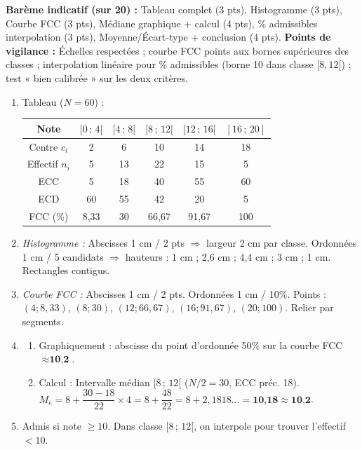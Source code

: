 \documentclass[11pt]{article}
\begin{document}
\begin{corrige}
\textbf{Barème indicatif (sur 20) :} Tableau complet (3 pts), Histogramme (3 pts), Courbe FCC (3 pts), Médiane graphique + calcul (4 pts), \% admissibles interpolation (3 pts), Moyenne/Écart-type + conclusion (4 pts).
\textbf{Points de vigilance :} Échelles respectées ; courbe FCC points aux bornes supérieures des classes ; interpolation linéaire pour \% admissibles (borne 10 dans classe $[8,12[$) ; test « bien calibrée » sur les deux critères.

\begin{enumerate}
\item Tableau ($N=60$) :
\begin{center}
\begin{tabular}{|c|ccccc|}\hline
Note & $[0\,;\,4[$ & $[4\,;\,8[$ & $[8\,;\,12[$ & $[12\,;\,16[$ & $[16\,;\,20]$ \\ \hline
Centre $c_i$ & 2 & 6 & 10 & 14 & 18 \\
Effectif $n_i$ & 5 & 13 & 22 & 15 & 5 \\
ECC & 5 & 18 & 40 & 55 & 60 \\
ECD & 60 & 55 & 42 & 20 & 5 \\
FCC (\%) & 8,33 & 30 & 66,67 & 91,67 & 100 \\ \hline
\end{tabular}
\end{center}
\item \textit{Histogramme :} Abscisses 1 cm / 2 pts $\Rightarrow$ largeur 2 cm par classe. Ordonnées 1 cm / 5 candidats $\Rightarrow$ hauteurs : 1 cm ; 2,6 cm ; 4,4 cm ; 3 cm ; 1 cm. Rectangles contigus.
\item \textit{Courbe FCC :} Abscisses 1 cm / 2 pts. Ordonnées 1 cm / 10\%. Points : $(4; 8,33)$, $(8; 30)$, $(12; 66,67)$, $(16; 91,67)$, $(20; 100)$. Relier par segments.
\item \begin{enumerate}
\item Graphiquement : abscisse du point d'ordonnée 50\% sur la courbe FCC $\approx \textbf{10,2}$.
\item Calcul : Intervalle médian $[8\,;\,12[$ ($N/2=30$, ECC préc. 18).
$M_e = 8 + \dfrac{30-18}{22}\times 4 = 8 + \dfrac{48}{22} = 8 + 2,1818... = \textbf{10,18} \approx \textbf{10,2}$.
\end{enumerate}
\item Admis si note $\ge 10$. Dans classe $[8\,;\,12[$, on interpole pour trouver l'effectif $< 10$.

\end{enumerate}
\end{corrige}
\end{document}
